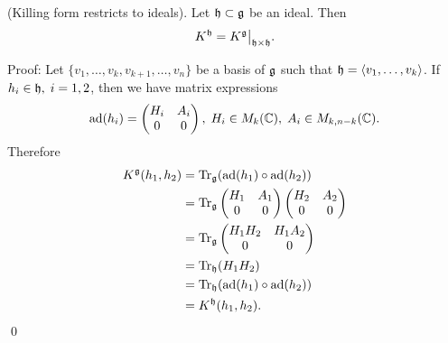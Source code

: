\begin{dang}
    \begin{lemma}
        (Killing form restricts to ideals). Let $\mathfrak{h}\subset\mathfrak{g}$ be an ideal. Then 
        \begin{equation}
            K^{\mathfrak{h}}=K^{\mathfrak{g}}\big|_{\mathfrak{h}\times\mathfrak{h}}.
        \end{equation} 
    \end{lemma}
\end{dang}
Proof: Let $\{v_1,\dots,v_k,v_{k+1},\dots,v_n\}$ be a basis of $\mathfrak{g}$ such that
 $\mathfrak{h}=\langle v_1,\dots,v_k\rangle$. If 
$h_i\in \mathfrak{h},\;i=1,2$, then we have matrix expressions 
\begin{equation}
    \text{ad}(h_i)=
        \begin{pmatrix}
            H_i&A_i\\0&0
        \end{pmatrix}
        ,\; H_i\in M_k(\mathbb{C}),\; A_i\in M_{k,n-k}(\mathbb{C}).
\end{equation}
Therefore 
\begin{equation}
    \begin{split}
        K^{\mathfrak{g}}(h_1,h_2)&=\text{Tr}_{\mathfrak{g}}(\text{ad}(h_1)\circ\text{ad}(h_2))\\
        &=\text{Tr}_{\mathfrak{g}} \begin{pmatrix}
            H_1&A_1\\0&0
        \end{pmatrix} \begin{pmatrix}
            H_2&A_2\\0&0
        \end{pmatrix}\\
        &=\text{Tr}_{\mathfrak{g}} \begin{pmatrix}
            H_1 H_2&H_1A_2\\0&0
        \end{pmatrix}\\
        &=\text{Tr}_{\mathfrak{h}}(H_1H_2)\\
        &=\text{Tr}_{\mathfrak{h}}(\text{ad}(h_1)\circ\text{ad}(h_2))\\
        &=K^{\mathfrak{h}}(h_1,h_2).
    \end{split}
\end{equation}
\qed

